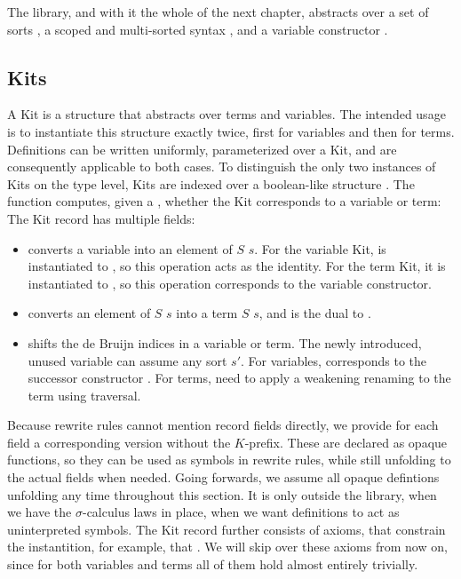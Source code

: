 \documentclass[screen,nonacm]{acmart}
\begin{document}
The library, and with it the whole of the next chapter, abstracts over a set of
sorts \ASortParam, a scoped and multi-sorted syntax \AScopedT, and a variable
constructor \AVarCstr.

\subsection{Kits}\label{sec:ags-kit}
A Kit is a structure that abstracts over terms and variables. The intended
usage is to instantiate this structure exactly twice, first for variables and
then for terms. Definitions can be written uniformly, parameterized over a Kit,
and are consequently applicable to both cases. \AKit{}To distinguish the only
two instances of Kits on the type level, Kits are indexed over a boolean-like
structure \AModeDef. The  function computes, given a
, whether the Kit corresponds to a variable or term:
\AImage{}The Kit record has multiple fields:
\begin{itemize}
      \item {} converts a variable into an element of $S$  $s$.
            For the variable Kit,  is instantiated to , so this operation acts as the identity.
            For the term Kit, it is instantiated to , so this operation corresponds to the variable constructor.
      \item {} converts an element of $S$  $s$ into a term $S$  $s$, and is the dual to .
      \item {} shifts the de Bruijn indices in a variable or term.
            The newly introduced, unused variable  can assume any sort $s'$.
            For variables,  corresponds to the successor constructor .
            For terms,  need to apply a weakening renaming to the term using traversal.
\end{itemize}
Because rewrite rules cannot mention record fields directly, we provide for each field a
corresponding version without the $K$-prefix. These are declared as opaque functions, so
they can be used as symbols in rewrite rules, while still unfolding to the actual fields
when needed. Going forwards, we assume all opaque defintions unfolding any time throughout this section.
It is only outside the library, when we have the $\sigma$-calculus laws in place, when we want
definitions to act as uninterpreted symbols. The Kit record further consists of axioms, that constrain the instantition, for
example, that \AAxiomEx. We will skip over these axioms from now on, since for
both variables and terms all of them hold almost entirely trivially.
\end{document}
